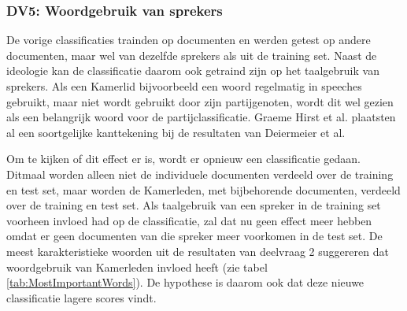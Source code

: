 \subsubsection{DV5: Woordgebruik van sprekers}
De vorige classificaties trainden op documenten en werden getest op andere documenten, maar wel van dezelfde sprekers als uit de training set. Naast de ideologie kan de classificatie daarom ook getraind zijn op het taalgebruik van sprekers. Als een Kamerlid bijvoorbeeld een woord regelmatig in speeches gebruikt, maar niet wordt gebruikt door zijn partijgenoten, wordt dit wel gezien als een belangrijk woord voor de partijclassificatie. Graeme Hirst et al. \cite{Hirst_textto} plaatsten al een soortgelijke kanttekening bij de resultaten van Deiermeier et al.\par
Om te kijken of dit effect er is, wordt er opnieuw een classificatie gedaan. Ditmaal worden alleen niet de individuele documenten verdeeld over de training en test set, maar worden de Kamerleden, met bijbehorende documenten, verdeeld over de training en test set. Als taalgebruik van een spreker in de training set voorheen invloed had op de classificatie, zal dat nu geen effect meer hebben omdat er geen documenten van die spreker meer voorkomen in de test set. De meest karakteristieke woorden uit de resultaten van deelvraag 2 suggereren dat woordgebruik van Kamerleden invloed heeft (zie tabel \ref{tab:MostImportantWords}). De hypothese is daarom ook dat deze nieuwe classificatie lagere scores vindt.\par


